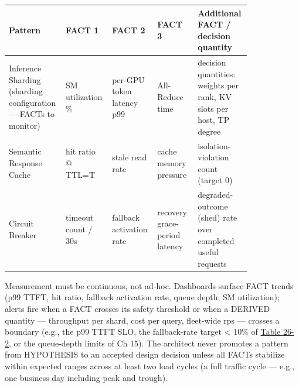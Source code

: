 \nopagebreak[4]
\begin{longtable}[]{@{}
  >{\raggedright\arraybackslash}p{0.1647\linewidth}
  >{\raggedright\arraybackslash}p{0.1647\linewidth}
  >{\raggedright\arraybackslash}p{0.1647\linewidth}
  >{\raggedright\arraybackslash}p{0.1647\linewidth}
  >{\raggedright\arraybackslash}p{0.1647\linewidth}@{}}
\toprule\noalign{}
\begin{minipage}[b]{\linewidth}\raggedright
Pattern
\end{minipage} & \begin{minipage}[b]{\linewidth}\raggedright
FACT 1
\end{minipage} & \begin{minipage}[b]{\linewidth}\raggedright
FACT 2
\end{minipage} & \begin{minipage}[b]{\linewidth}\raggedright
FACT 3
\end{minipage} & \begin{minipage}[b]{\linewidth}\raggedright
Additional FACT / decision quantity
\end{minipage} \\
\midrule\noalign{}
\endhead
\bottomrule\noalign{}
\endlastfoot
Inference Sharding (sharding configuration --- FACTs to monitor) & SM
utilization \% & per-GPU token latency p99 & All-Reduce time & decision
quantities: weights per rank, KV slots per host, TP degree \\
\noalign{\label{tab:26.1}}
Semantic Response Cache & hit ratio @ TTL=T & stale read rate & cache
memory pressure & isolation-violation count (target 0) \\
Circuit Breaker & timeout count / 30s & fallback activation rate &
recovery grace-period latency & degraded-outcome (shed) rate over
completed useful requests \\
\end{longtable}

Measurement must be continuous, not ad-hoc. Dashboards surface FACT
trends (p99 TTFT, hit ratio, fallback activation rate, queue depth, SM
utilization); alerts fire when a FACT crosses its safety threshold or
when a DERIVED quantity --- throughput per shard, cost per query,
fleet-wide rps --- crosses a boundary (e.g., the p99 TTFT SLO, the
fallback-rate target \textless{} 10\% of \hyperref[tab:26.2]{Table 26-2}, or the queue-depth
limits of Ch 15). The architect never promotes a pattern from HYPOTHESIS
to an accepted design decision unless all FACTs stabilize within
expected ranges across at least two load cycles (a full traffic cycle
--- e.g., one business day including peak and trough).

